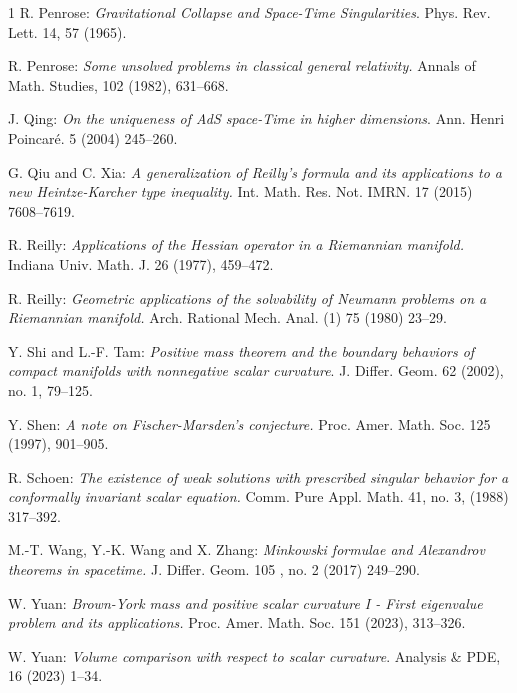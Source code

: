 \documentclass{amsart}
\numberwithin{equation}{section}
\begin{document}
\begin{thebibliography}{1}
		 R. Penrose: \emph{Gravitational Collapse and Space-Time Singularities}. Phys. Rev. Lett.  14, 57 (1965).
		
		 R. Penrose: \emph{Some unsolved problems in classical general relativity.} Annals of Math. Studies, 102 (1982), 631--668.
		
		 J. Qing: {\it On the uniqueness of AdS space-Time in higher dimensions}. Ann. Henri
Poincar\'e. 5 (2004) 245--260.
		
		 G. Qiu and C. Xia: \emph{A generalization of Reilly’s formula and its applications to a new Heintze-Karcher type inequality.} Int. Math. Res. Not. IMRN. 17 (2015) 7608--7619.
		

 R. Reilly: \emph{Applications of the Hessian operator in a Riemannian manifold.} Indiana Univ. Math. J. 26 (1977), 459--472.		
				
		
		 R. Reilly: \emph{Geometric applications of the solvability of Neumann problems on a Riemannian manifold.} Arch. Rational Mech. Anal. (1) 75 (1980) 23--29.

		 Y. Shi and L.-F. Tam: {\it Positive mass theorem and the boundary behaviors of compact manifolds with nonnegative scalar curvature}. J. Differ. Geom. 62 (2002), no. 1, 79--125.
		
	
 Y. Shen: \emph{A note on Fischer-Marsden's conjecture.} Proc. Amer. Math. Soc. 125 (1997), 901--905.

 R. Schoen: \emph{The existence of weak solutions with prescribed singular behavior for a conformally invariant scalar equation.} Comm. Pure Appl. Math. 41, no. 3, (1988) 317--392.
		
		 M.-T. Wang, Y.-K. Wang and X. Zhang: \emph{Minkowski formulae and Alexandrov theorems in spacetime.} J. Differ. Geom. 105 , no. 2 (2017) 249–290.
		
		 W. Yuan: \emph{Brown-York mass and positive scalar curvature I - First eigenvalue problem and its applications.} Proc. Amer. Math. Soc. 151 (2023), 313--326.


 W. Yuan: {\it Volume comparison with respect to scalar curvature}. Analysis \& PDE, 16 (2023) 1--34.
		
	\end{thebibliography}
	
	
\end{document}
